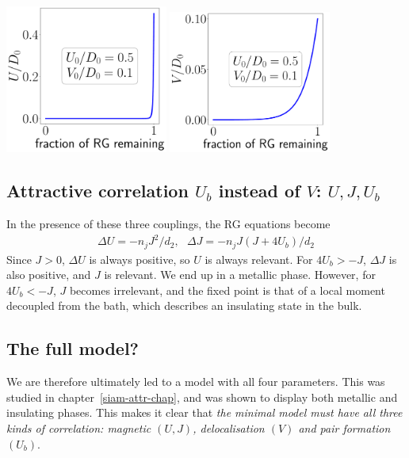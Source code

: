 \begin{center}
	\includegraphics[width=0.4\textwidth]{../figures/no_J_Ub=-0.10_D=100_U.pdf}
	\includegraphics[width=0.4\textwidth]{../figures/no_J_Ub=-0.10_D=100_V.pdf}
	\label{noJ_Ub_lt_0_D}
\end{center}

\subsection{Attractive correlation \(U_b\) instead of \(V\): \(U,J,U_b\)}
In the presence of these three couplings, the RG equations become
\begin{equation}\begin{aligned}
	\Delta U = -n_j J^2/d_2,~ ~ ~ \Delta J = -n_j J(J+4U_b)/d_2
\end{aligned}\end{equation}
Since \(J > 0\), \(\Delta U\) is always positive, so \(U\) is always relevant. For \(4U_b > -J\), \(\Delta J\) is also positive, and \(J\) is relevant. We end up in a metallic phase. However, for \(4U_b < -J\), \(J\) becomes irrelevant, and the fixed point is that of a local moment decoupled from the bath, which describes an insulating state in the bulk.

\subsection{The full model?}
We are therefore ultimately led to a model with all four parameters. This was studied in chapter~\ref{siam-attr-chap}, and was shown to display both metallic and insulating phases. This makes it clear that {\it the minimal model must have all three kinds of correlation: magnetic \((U,J)\), delocalisation \((V)\) and pair formation \((U_b)\)}.
